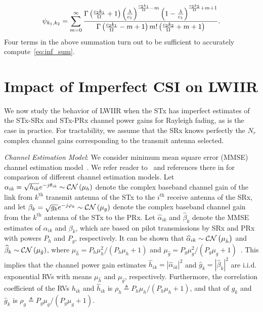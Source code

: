 \documentclass[12pt,draftcls,peerreview,onecolumn]{IEEEtran}
\newcommand{\CN}{{\cal CN}}
\newcommand{\define}{\triangleq}
\newcommand{\lam}{\lambda}
\newcommand{\mug}{{\mu_{g}}}
\newcommand{\muh}{{\mu_{h}}}
\newcommand{\Nr}{{N_r}}
\newcommand{\such}{h}
\newcommand{\puch}{g}
\newcommand{\hk}[1]{{\such_{#1}}}
\newcommand{\gk}[1]{{\puch_{#1}}}
\newcommand{\cone}{c_{1}}
\newcommand{\ctwo}{c_{2}}
\newcommand{\lambym}{\frac{\lam}{\cone}}
\newcommand{\al}{\ctwo}
\newcommand{\snr}{\Omega}
\newcommand{\albysnr}[1][]{\frac{\al#1}{\snr}}
\newcommand{\suchph}{\theta}
\newcommand{\puchph}{\varphi}
\newcommand{\psifun}[2]{\psi_{{#1},{#2}}}
\newcommand{\ith}{i^{\text{th}}}
\newcommand{\kth}{k^{\text{th}}}
\newcommand{\akone}{\albysnr[k_1]}
\newcommand{\sug}{\alpha}
\newcommand{\pug}{\beta}
\newcommand{\sugain}[1]{\sug_{#1}}
\newcommand{\pugain}[1]{\pug_{#1}}
\newcommand{\sugainhat}[1]{\widehat{\sug}_{#1}}
\newcommand{\pugainhat}[1]{\widehat{\pug}_{#1}}
\newcommand{\gpilotpower}{P_g}
\newcommand{\hpilotpower}{P_h}
\newcommand{\hhat}{\hat{\such}}
\newcommand{\ghat}{\hat{\puch}}
\newcommand{\hkhat}[1]{\hhat_{#1}}
\newcommand{\gkhat}[1]{\ghat_{#1}}
\newcommand{\muhhat}{\mu_{\hhat}}
\newcommand{\mughat}{\mu_{\ghat}}
\newcommand{\rhog}{\rho_g}
\newcommand{\rhoh}{\rho_h}
\begin{document}
%
\begin{equation}
\psifun{k_1}{k_2} = \sum_{\midx=0}^{\infty} \frac{\Gamma\left(\akone+1 \right) \left(\lambym\right)^{\albysnr[k_1]  - \midx} \left(1-\lambym\right)^{\albysnr[k_2]+\midx+1}}{\Gamma\left(\akone-\midx+1 \right)\midx ! \left(\albysnr[k_2]+\midx+1\right)}. 
\label{eq:inf_sum}
\end{equation}
Four terms in the above summation turn out to be sufficient to accurately compute~\eqref{eq:inf_sum}.  
%
%


\section{Impact of Imperfect CSI on LWIIR}
\label{sec:imperfectcsi}
We now study the behavior of LWIIR when the STx has imperfect estimates of the STx-SRx and STx-PRx channel power gains for Rayleigh fading, as is the case in practice. For tractability, we assume that the SRx knows perfectly the $\Nr$ complex channel gains corresponding to the transmit antenna selected. %


{\em Channel Estimation Model}: We consider minimum mean square error (MMSE) channel estimation model~\cite{Sboui_2013_TWC,Kashyap_2014_TCOM,musavian_2009_tcom}. We refer reader to~\cite{Zhang_2017_tcom,Kashyap_2015_wicomlet} and references there in for comparison of different channel estimation models.  Let $ \sugain{ik}= \sqrt{\hk{ik}}e^{-j\suchph_{ik}}\sim\CN\left(\muh\right) $ denote the complex baseband channel gain of the link from $\kth$ transmit antenna of the STx to the $\ith$ receive antenna of the SRx, and let $\pugain{k} = \sqrt{\gk{k}}e^{-j\puchph_{k}}\sim\CN\left(\mug\right)$ denote the complex baseband channel gain from the $\kth$ antenna of the STx to the PRx. Let $\sugainhat{ik}$ and $\pugainhat{k}$ denote the MMSE estimates of $\sugain{ik}$ and $\pugain{k}$, which are based on pilot transmissions by SRx and PRx with powers $\hpilotpower$ and $\gpilotpower$, respectively.  It can be shown that  $\sugainhat{ik}\sim\CN\left(\muhhat \right)$ and $\pugainhat{k}\sim \CN\left(\mughat\right)$, where  $\muhhat ={\hpilotpower\mu^2_{\such}}/{\left( \hpilotpower\muh+1\right)}$ and $\mughat = {\gpilotpower\mu^2_{\puch}}/{\left( \gpilotpower\mug+1\right)}$~\cite{Kashyap_2014_TCOM}.  
This implies that the channel power gain estimates $\hkhat{ik}=|\sugainhat{ik}|^2$ and $\gkhat{k}=|\pugainhat{k}|^2$ are i.i.d. exponential RVs with means $\muhhat$ and $\mughat$, respectively. Furthermore, the correlation coefficient  of the RVs $\hk{ik}$ and $\hkhat{ik}$ is $\rhoh\define{\hpilotpower\muh}/{\left( \hpilotpower\muh + 1\right) }$, and that of $\gk{k}$ and $\gkhat{k}$ is $\rhog \define{\gpilotpower\mug}/{\left( \gpilotpower\mug + 1\right) }$. 
\end{document}
